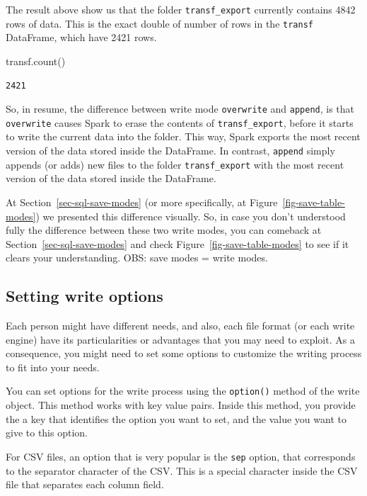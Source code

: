 \documentclass[
  11pt,
  letterpaper,
  DIV=11,
  numbers=noendperiod]{scrreprt}
\newenvironment{Shaded}{\begin{snugshade}}{\end{snugshade}}
\newcommand{\NormalTok}[1]{\textcolor[rgb]{0.00,0.23,0.31}{#1}}
\begin{document}
The result above show us that the folder \texttt{transf\_export}
currently contains 4842 rows of data. This is the exact double of number
of rows in the \texttt{transf} DataFrame, which have 2421 rows.

\begin{Shaded}
\begin{Highlighting}[]
\NormalTok{transf.count()}
\end{Highlighting}
\end{Shaded}

\begin{verbatim}
2421
\end{verbatim}

So, in resume, the difference between write mode \texttt{overwrite} and
\texttt{append}, is that \texttt{overwrite} causes Spark to erase the
contents of \texttt{transf\_export}, before it starts to write the
current data into the folder. This way, Spark exports the most recent
version of the data stored inside the DataFrame. In contrast,
\texttt{append} simply appends (or adds) new files to the folder
\texttt{transf\_export} with the most recent version of the data stored
inside the DataFrame.

At Section~\ref{sec-sql-save-modes} (or more specifically, at
Figure~\ref{fig-save-table-modes}) we presented this difference
visually. So, in case you don't understood fully the difference between
these two write modes, you can comeback at
Section~\ref{sec-sql-save-modes} and check
Figure~\ref{fig-save-table-modes} to see if it clears your
understanding. OBS: save modes = write modes.

\hypertarget{setting-write-options}{%
\subsection{Setting write options}\label{setting-write-options}}

Each person might have different needs, and also, each file format (or
each write engine) have its particularities or advantages that you may
need to exploit. As a consequence, you might need to set some options to
customize the writing process to fit into your needs.

You can set options for the write process using the \texttt{option()}
method of the write object. This method works with key value pairs.
Inside this method, you provide the a key that identifies the option you
want to set, and the value you want to give to this option.

For CSV files, an option that is very popular is the \texttt{sep}
option, that corresponds to the separator character of the CSV. This is
a special character inside the CSV file that separates each column
field.
\end{document}
